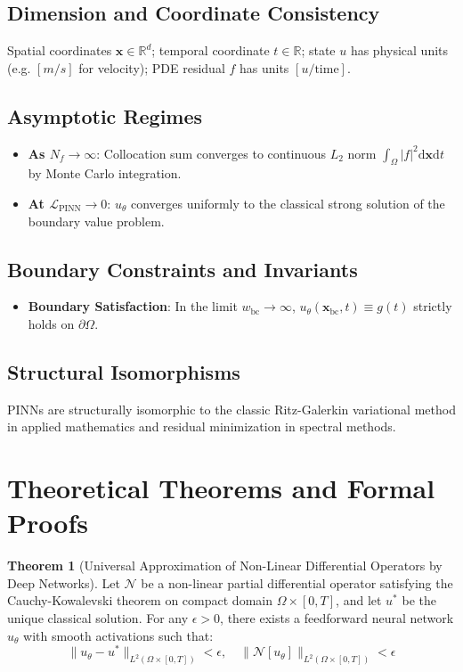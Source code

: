\documentclass[11pt,a4paper]{article}
\theoremstyle{definition}
\newtheorem{theorem}{\textbf{Theorem}}[section]
\begin{document}
\subsection{Dimension and Coordinate Consistency}
Spatial coordinates $\mathbf{x} \in \mathbb{R}^d$; temporal coordinate $t \in \mathbb{R}$; state $u$ has physical units (e.g. $[m/s]$ for velocity); PDE residual $f$ has units $[u / \text{time}]$.

\subsection{Asymptotic Regimes}
\begin{itemize}
    \item \textbf{As $N_f \to \infty$}: Collocation sum converges to continuous $L_2$ norm $\int_\Omega |f|^2 \mathrm{d}\mathbf{x} \mathrm{d}t$ by Monte Carlo integration.
    \item \textbf{At $\mathcal{L}_{\text{PINN}} \to 0$}: $u_\theta$ converges uniformly to the classical strong solution of the boundary value problem.
\end{itemize}

\subsection{Boundary Constraints and Invariants}
\begin{itemize}
    \item \textbf{Boundary Satisfaction}: In the limit $w_{\text{bc}} \to \infty$, $u_\theta(\mathbf{x}_{\text{bc}}, t) \equiv g(t)$ strictly holds on $\partial \Omega$.
\end{itemize}

\subsection{Structural Isomorphisms}
PINNs are structurally isomorphic to the classic Ritz-Galerkin variational method in applied mathematics and residual minimization in spectral methods.

\section{Theoretical Theorems and Formal Proofs}

\begin{theorem}[Universal Approximation of Non-Linear Differential Operators by Deep Networks]
Let $\mathcal{N}$ be a non-linear partial differential operator satisfying the Cauchy-Kowalevski theorem on compact domain $\Omega \times [0, T]$, and let $u^*$ be the unique classical solution. For any $\epsilon > 0$, there exists a feedforward neural network $u_\theta$ with smooth activations such that:
{\boldmath
\begin{equation}
\|u_\theta - u^*\|_{L^2(\Omega \times [0, T])} < \epsilon, \quad \|\mathcal{N}[u_\theta]\|_{L^2(\Omega \times [0, T])} < \epsilon
\end{equation}
}
\end{theorem}
\end{document}
